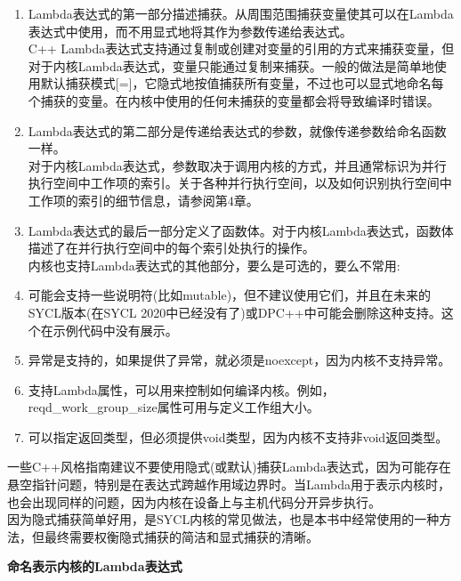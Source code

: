 \begin{enumerate}
	\item Lambda表达式的第一部分描述捕获。从周围范围捕获变量使其可以在Lambda表达式中使用，而不用显式地将其作为参数传递给表达式。\\
	C++ Lambda表达式支持通过复制或创建对变量的引用的方式来捕获变量，但对于内核Lambda表达式，变量只能通过复制来捕获。一般的做法是简单地使用默认捕获模式[=]，它隐式地按值捕获所有变量，不过也可以显式地命名每个捕获的变量。在内核中使用的任何未捕获的变量都会将导致编译时错误。
	\item Lambda表达式的第二部分是传递给表达式的参数，就像传递参数给命名函数一样。\\
	对于内核Lambda表达式，参数取决于调用内核的方式，并且通常标识为并行执行空间中工作项的索引。关于各种并行执行空间，以及如何识别执行空间中工作项的索引的细节信息，请参阅第4章。
	\item Lambda表达式的最后一部分定义了函数体。对于内核Lambda表达式，函数体描述了在并行执行空间中的每个索引处执行的操作。\\
	内核也支持Lambda表达式的其他部分，要么是可选的，要么不常用:
	\item 可能会支持一些说明符(比如mutable)，但不建议使用它们，并且在未来的SYCL版本(在SYCL 2020中已经没有了)或DPC++中可能会删除这种支持。这个在示例代码中没有展示。
	\item 异常是支持的，如果提供了异常，就必须是noexcept，因为内核不支持异常。
	\item 支持Lambda属性，可以用来控制如何编译内核。例如，reqd\_work\_group\_size属性可用与定义工作组大小。
	\item 可以指定返回类型，但必须提供void类型，因为内核不支持非void返回类型。
\end{enumerate}

\begin{tcolorbox}[colback=blue!5!white,colframe=blue!75!black, title=Lambda捕获:隐式还是显式?]
一些C++风格指南建议不要使用隐式(或默认)捕获Lambda表达式，因为可能存在悬空指针问题，特别是在表达式跨越作用域边界时。当Lambda用于表示内核时，也会出现同样的问题，因为内核在设备上与主机代码分开异步执行。\\

因为隐式捕获简单好用，是SYCL内核的常见做法，也是本书中经常使用的一种方法，但最终需要权衡隐式捕获的简洁和显式捕获的清晰。
\end{tcolorbox}

\hspace*{\fill} \par %
\textbf{命名表示内核的Lambda表达式}

